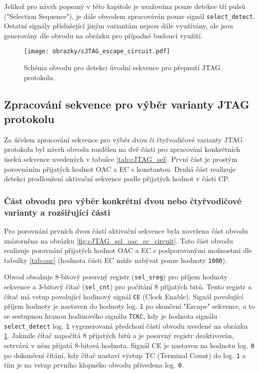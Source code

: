 Jelikož pro návrh popsaný v této kapitole je uvažována pouze detekce tří pulsů ("Selection Sequence"), je dále obvodem zpracováván pouze signál \texttt{select\_detect}. Ostatní signály příslušející jiným variantám nejsou dále využívány, ale jsou generovány dle obvodu na obrázku pro případné budoucí využití.

\begin{figure}[!h]
  \begin{center}
    \texttt{[image: obrazky/cJTAG\_escape\_circuit.pdf]}
  \end{center}
  \caption{Schéma obvodu pro detekci úvodní sekvence pro přepnutí \acs{JTAG} protokolu.}
	\label{fig:cJTAG_escape_circuit}
\end{figure}

\subsection{Zpracování sekvence pro výběr varianty \acs{JTAG} protokolu}	\label{subsec:sel_seq_det}
Za účelem zpracování sekvence pro výběr dvou či čtyřvodičové varianty \acs{JTAG} protokolu byl návrh obvodu rozdělen na dvě části pro zpracování konkrétních úseků sekvence uvedených v tabulce \ref{tab:cJTAG_sel}. První část je prostým porovnáním přijatých hodnot \acs{OAC} a \acs{EC} s konstantou. Druhá část realizuje detekci prodloužení aktivační sekvence podle přijatých hodnot v části \acs{CP}.

\subsubsection{Část obvodu pro výběr konkrétní dvou nebo čtyřvodičové varianty a rozšiřující části}
Pro porovnání prvních dvou částí aktivační sekvence byla navržena část obvodu znázorněna na obrázku \ref{fig:cJTAG_sel_oac_ec_circuit}. Tato část obvodu realizuje porovnání přijatých hodnot \acs{OAC} a \acs{EC} s podporovanými možnostmi dle tabulky \ref{tab:oac} (hodnota části \acs{EC} může nabývat pouze hodnoty \texttt{1000}).

Obvod obsahuje 8-bitový posuvný registr (\texttt{sel\_sreg}) pro příjem hodnoty sekvence a 3-bitový čítač (\texttt{sel\_cnt}) pro počítání 8 přijatých bitů. Tento registr a čítač má vstup povolující hodinový signál \texttt{CE} (Clock Enable). Signál povolující příjem hodnoty je nastaven do hodnoty log. \texttt{1} po skončení "Escape" sekvence, a to se sestupnou hranou hodinového signálu \texttt{\acs{TCKC}}, kdy je hodnota signálu \texttt{select\_detect} log. \texttt{1} vygenerovaná předchozí částí obvodu uvedené na obrázku \ref{fig:cJTAG_escape_circuit}. Jakmile čítač napočítá 8 přijatých bitů a je posuvný registr deaktivován, setrvává v něm přijatá 8-bitová hodnota. Signál CE je nastaven na hodnotu log. \texttt{0} po dokončení čítání, kdy čítač nastaví výstup TC (Terminal Count) do log. \texttt{1} a tím je na vstup prvního klopného obvodu přivedena log. \texttt{0}.

